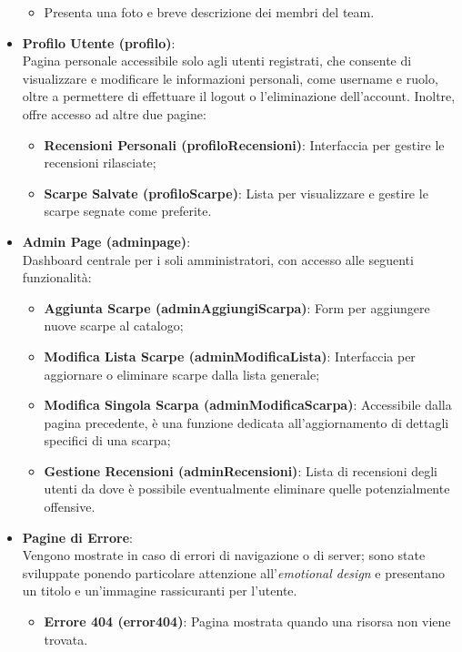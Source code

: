 \documentclass[a4paper, 12pt]{article}
\begin{document}
\begin{justify}
\begin{itemize}
\begin{itemize}
            \item Presenta una foto e breve descrizione dei membri del team.
        \end{itemize}
    \item \textbf{Profilo Utente (profilo)}:\\ 
    Pagina personale accessibile solo agli utenti registrati, che consente di visualizzare e modificare le informazioni personali, come username e ruolo, oltre a permettere di effettuare il logout o l'eliminazione dell'account. Inoltre, offre accesso ad altre due pagine:
        \begin{itemize}
            \item \textbf{Recensioni Personali (profiloRecensioni)}: Interfaccia per gestire le recensioni rilasciate;
            \item \textbf{Scarpe Salvate (profiloScarpe)}: Lista per visualizzare e gestire le scarpe segnate come preferite.
        \end{itemize}
    \item \textbf{Admin Page (adminpage)}:\\ 
    Dashboard centrale per i soli amministratori, con accesso alle seguenti funzionalità:
        \begin{itemize}
            \item \textbf{Aggiunta Scarpe (adminAggiungiScarpa)}: Form per aggiungere nuove scarpe al catalogo;
            \item \textbf{Modifica Lista Scarpe (adminModificaLista)}: Interfaccia per aggiornare o eliminare scarpe dalla lista generale;
            \item \textbf{Modifica Singola Scarpa (adminModificaScarpa)}: Accessibile dalla pagina precedente, è una funzione dedicata all'aggiornamento di dettagli specifici di una scarpa;
            \item \textbf{Gestione Recensioni (adminRecensioni)}: Lista di recensioni degli utenti da dove è possibile eventualmente eliminare quelle potenzialmente offensive.
        \end{itemize}
    \item \textbf{Pagine di Errore}:\\
    Vengono mostrate in caso di errori di navigazione o di server; sono state sviluppate ponendo particolare attenzione all'\textit{emotional design} e presentano un titolo e un'immagine rassicuranti per l'utente.
        \begin{itemize}
            \item \textbf{Errore 404 (error404)}: Pagina mostrata quando una risorsa non viene trovata.

\end{itemize}
\end{itemize}
\end{justify}
\end{document}
